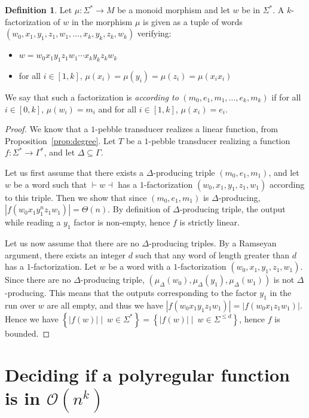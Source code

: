 \documentclass{article}
\newcommand{\set}[1]{\left\{#1 \right\}}
\newcommand{\Oo}{\mathcal O}
\theoremstyle{definition}
\newtheorem{definition}[theorem]{Definition}
\theoremstyle{remark}
\begin{document}
\begin{definition}
    Let $\mu:\Sigma^*\to M$ be a monoid morphism and let $w$ be in $ \Sigma^*$.
    A $k$-factorization of $w$ in the morphism $\mu$ is given as a tuple of words $(w_0,x_{1},y_1,z_1,w_1,\ldots,x_k,y_k,z_k, w_k)$ verifying:
    \begin{itemize}   
        \item  $w=w_0x_1y_1z_1w_1\cdots x_ky_kz_kw_k$
        \item for all $i\in [1,k]$, $\mu(x_i)=\mu(y_i)=\mu(z_i)=\mu(x_ix_i)$
    \end{itemize}
    We say that such a factorization is \emph{according to} $(m_0,e_1,m_1,\ldots,e_k,m_k)$ if for all $i\in [0,k]$, $\mu(w_i)=m_i$ and for all $i\in [1,k]$, $\mu(x_{i})=e_i$.
\end {definition}

\begin{proof}
    We know that a $1$-pebble transducer realizes a linear function, from Proposition~\ref{prop:degree}.
    Let $T$ be a $1$-pebble transducer realizing a function $f:\Sigma^*\to \Gamma^*$, and let $\Delta\subseteq \Gamma$.

    Let us first assume that there exists a $\Delta$-producing triple $(m_0,e_1,m_1)$, and let $w$ be a word such that ${\vdash} w{\dashv }$ has a $1$-factorization $(w_0,x_1,y_1,z_1,w_1)$ according to this triple.
    Then we show that since $(m_0,e_1,m_1)$ is $\Delta$-producing, $|f(w_0x_1y_1^nz_1w_1)|=\Theta(n)$.
    By definition of $\Delta$-producing triple, the output while reading a $y_1$ factor is non-empty, hence $f$ is strictly linear.

    Let us now assume that there are no $\Delta$-producing triples.
    By a Ramseyan argument, there exists an integer $d$ such that any word of length greater than $d$ has a $1$-factorization.
    Let $w$ be a word with a $1$-factorization $(w_0,x_1,y_1,z_1,w_1)$. Since there are no $\Delta$-producing triple, $(\mu_\Delta(w_0),\mu_\Delta(y_1),\mu_\Delta(w_1))$ is not $\Delta$-producing. This means that the outputs corresponding to the factor $y_1$ in the run over $w$ are all empty, and thus we have $|f(w_0x_1y_1z_1w_1)|=|f(w_0x_1z_1w_1)|$.
    Hence we have $\set{|f(w)|\mid\ w\in \Sigma^*}=\set{|f(w)|\mid\ w\in \Sigma^{\leq d}}$, hence $f$ is bounded.
\end{proof}



\section{Deciding if a polyregular function is in $\Oo(n^k)$}
\label{sec:poly}
\end{document}
